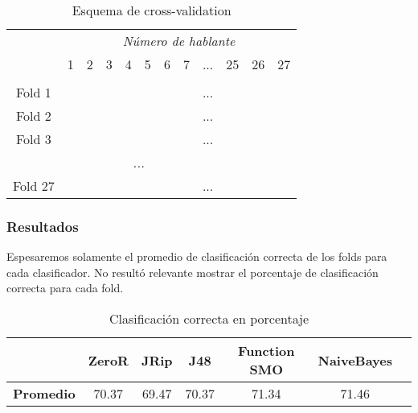 \begin{table}[H]
	\centering
	\begin{tabular}{cccccccccccc}
		& \multicolumn{11}{c}{\textit{Número de hablante}} \\
		& 1 & 2 & 3 & 4 & 5 & 6 & 7 & ... & 25 & 26 & 27 \\
		\hline \\
		Fold 1 &\mycirc[red] & \mycirc[blue] & \mycirc[blue]  & \mycirc[blue]  & \mycirc[blue]  & \mycirc[blue]  & \mycirc[blue] & ... & \mycirc[blue] & \mycirc[blue] & \mycirc[blue]  \\
		
		Fold 2 &\mycirc[blue] & \mycirc[red] & \mycirc[blue]  & \mycirc[blue]  & \mycirc[blue]  & \mycirc[blue]  & \mycirc[blue] & ... & \mycirc[blue] & \mycirc[blue] & \mycirc[blue]  \\
		
		Fold 3 &\mycirc[blue] & \mycirc[blue] & \mycirc[red]  & \mycirc[blue]  & \mycirc[blue]  & \mycirc[blue]  & \mycirc[blue] & ... & \mycirc[blue] & \mycirc[blue] & \mycirc[blue]  \\
	
		\multicolumn{11}{c}{\textit{...}}	\\
		
		Fold 27 &\mycirc[blue] & \mycirc[blue] & \mycirc[blue]  & \mycirc[blue]  & \mycirc[blue]  & \mycirc[blue]  & \mycirc[blue] & ... & \mycirc[blue] & \mycirc[blue] & \mycirc[red]   \\
	
	\end{tabular}
	\caption{Esquema de cross-validation}
	\label{esq_cv}
\end{table}
		
\subsubsection{Resultados}

Espesaremos solamente el promedio de clasificación correcta de los folds para cada clasificador. No resultó relevante mostrar el porcentaje de clasificación correcta para cada fold. 

\begin{table}[H]
	\centering
	\begin{tabular}{|l|c|c|c|c|c|c|}
		\hline
		\textbf{}  & \textbf{ZeroR} & \textbf{JRip} & \textbf{J48} & \textbf{Function SMO} & \textbf{NaiveBayes} \\ \hline
		\textbf{Promedio} & 70.37  & 69.47 & 70.37 & 71.34 & 71.46 \\ \hline
	\end{tabular}
	\caption{Clasificación correcta en porcentaje}
	\label{}
\end{table}

